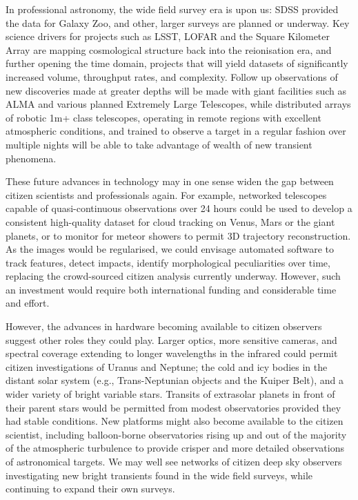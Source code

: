 \documentclass{ar2e}
\begin{document}
In professional astronomy, the wide field survey era is upon us: SDSS provided
the data for Galaxy Zoo, and other, larger surveys are planned or underway. Key
science drivers for projects such as LSST, LOFAR and the Square Kilometer Array
are mapping cosmological structure back into the reionisation era, and  further
opening the time domain, projects that will yield datasets of significantly
increased volume, throughput rates, and complexity.  Follow up observations of
new discoveries made at greater depths will be made with giant facilities such
as ALMA and various planned Extremely Large Telescopes, while distributed arrays
of robotic 1m+ class telescopes, operating in remote regions with excellent
atmospheric conditions, and trained to observe a target in a regular fashion
over multiple nights will be able to take advantage of wealth of new transient
phenomena. 

These future advances in technology may in one sense widen the gap between
citizen scientists and professionals again. For example, networked telescopes
capable of quasi-continuous observations over 24 hours could be used to develop
a consistent high-quality dataset for cloud tracking on Venus, Mars or the giant
planets, or to monitor for meteor showers to permit 3D trajectory
reconstruction.   As the images would be regularised, we could envisage
automated software to track features, detect impacts, identify morphological
peculiarities over time, replacing the crowd-sourced citizen analysis currently
underway.  However, such an investment would require both international funding
and considerable time and effort.




However, the advances in hardware becoming available to citizen observers
suggest other roles they could play. Larger optics, more sensitive cameras,
and spectral coverage extending to longer wavelengths in the infrared could
permit citizen investigations of Uranus and Neptune; the cold and icy bodies
in the distant solar system (e.g., Trans-Neptunian objects and the Kuiper
Belt), and a wider variety of bright variable stars.  Transits of extrasolar
planets in front of their parent stars would be permitted from modest
observatories provided they had stable conditions.  New platforms might also
become available to the citizen scientist, including balloon-borne
observatories rising up and out of the majority of the atmospheric turbulence
to provide crisper and more detailed observations of astronomical targets. We
may well see networks of citizen deep sky observers investigating new bright
transients found in the wide field surveys,  while
continuing to expand their own surveys.
\end{document}
